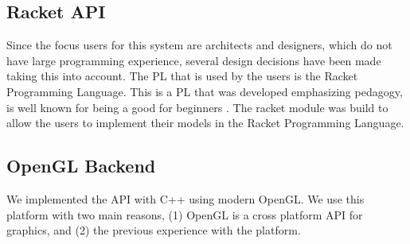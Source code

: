 \subsection{Racket API} %
\label{sub:racket_api}
Since the focus users for this system are architects and designers, which do not have large programming experience, several design decisions have been made taking this into account. The \gls{PL} that is used by the users is the Racket Programming Language. This is a \gls{PL} that was developed emphasizing pedagogy, is well known for being a good for beginners \cite{Findler1997}\cite{Findler2002}.
The racket module was build to allow the users to implement their models in the Racket Programming Language. 


\subsection{OpenGL Backend} %
\label{sub:opengl_backend}
We implemented the API with C++ using modern OpenGL. We use this platform with two main reasons, (1) OpenGL is a cross platform API for graphics, and (2) the previous experience with the platform.



